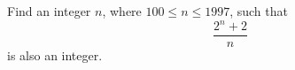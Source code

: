 Find an integer $n$, where $100 \leq n \leq 1997$, such that \[ \frac{2^n+2}{n}  \] is also an integer.